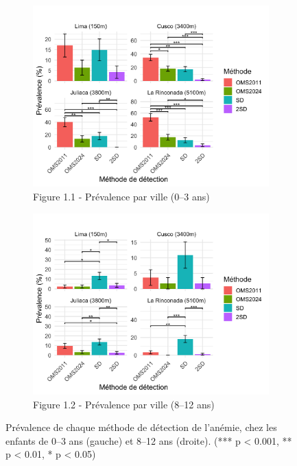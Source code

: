 \documentclass[12pt,a4paper]{article}
\begin{document}
\begin{figure}[H]
    \centering

    \begin{subfigure}{0.48\textwidth}
        \includegraphics[width=\linewidth]{Rplot.png}
        \caption{Figure 1.1 - Prévalence par ville (0–3 ans)}
        \label{fig:pre03}
    \end{subfigure}
    \hfill
    \begin{subfigure}{0.48\textwidth}
        \includegraphics[width=\linewidth]{Rplot12yo.png}
        \caption{Figure 1.2 - Prévalence par ville (8–12 ans)}
        \label{fig:pre812}
    \end{subfigure}

    \caption{Prévalence de chaque méthode de détection de l'anémie, chez les enfants de 0–3 ans (gauche) et 8–12 ans (droite). (*** p < 0.001, ** p < 0.01, * p < 0.05)}
    \label{fig:pre}
\end{figure}
\end{document}
